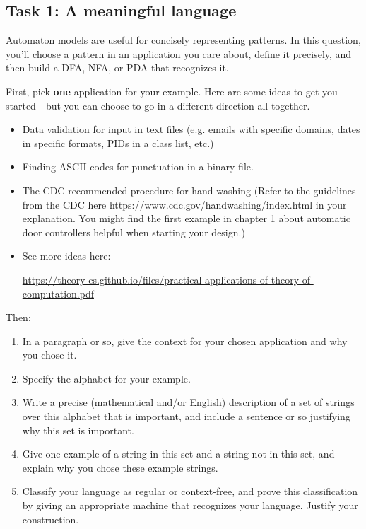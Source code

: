 \documentclass[12pt, oneside]{article}
\begin{document}
\newpage
\subsection*{Task 1: A meaningful language}

Automaton models are useful for concisely representing patterns. 
In this question, you'll choose a pattern in an application you care about, 
define it precisely, and then build a DFA, NFA, or PDA that 
recognizes it.

First, pick {\bf one} application for your example. 
Here are some ideas to 
get you started - but you can choose to go in a different direction all together.
\begin{itemize}
\item Data validation for input in text files (e.g. emails with 
specific domains, dates in specific formats, PIDs in a class list, etc.)
\item Finding ASCII codes for punctuation in a binary file.
\item The CDC recommended procedure for hand washing (Refer to the guidelines from the CDC here https://www.cdc.gov/handwashing/index.html in your explanation. You might find the first example in chapter 1 about automatic door controllers helpful when starting your design.)
\item See more ideas here: 

{\scriptsize \url{https://theory-cs.github.io/files/practical-applications-of-theory-of-computation.pdf}}
\end{itemize}

Then:
\begin{enumerate}
    \item In a paragraph or so, give the context for your chosen
    application and why you chose it.
    \item Specify the alphabet for your example.
    \item Write a precise (mathematical and/or English) description
    of a set of strings over this alphabet that is important, 
    and include a sentence or so justifying why this set is important.
    \item Give one example of a string in this set and a string not 
    in this set, and explain why you chose these example strings.
    \item Classify your language as regular or context-free, and prove
    this classification by giving an appropriate machine that
    recognizes your language. Justify your construction.
\end{enumerate}
\end{document}
